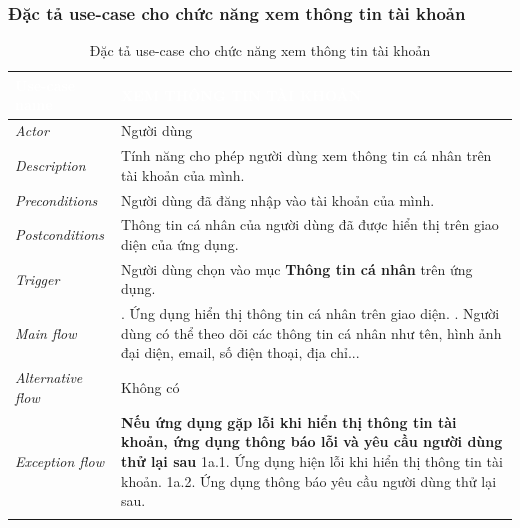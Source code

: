 \subsubsection{Đặc tả use-case cho chức năng xem thông tin tài khoản}
\begin{center}
    \arrayrulewidth=2pt
    \begin{longtable}{
        |>{\raggedright\arraybackslash}p{3cm}
        |>{\raggedright\arraybackslash}p{13cm}
        |}
        \hline
        \rowcolor{cyan!75!black} \textcolor{white}{\textbf{Use-case name}} & \textcolor{white}{\textbf{XEM THÔNG TIN TÀI KHOẢN}}
        \\\hline
        \rowcolor{cyan!10!white} \textit{Actor} & Người dùng
        \\\hdashline
        \rowcolor{cyan!10!white} \textit{Description} & Tính năng cho phép người dùng xem thông tin cá nhân trên tài khoản của mình.
        \\\hdashline
        \rowcolor{cyan!10!white} \textit{Preconditions} & Người dùng đã đăng nhập vào tài khoản của mình.
        \\\hdashline
        \rowcolor{cyan!10!white} \textit{Postconditions} & Thông tin cá nhân của người dùng đã được hiển thị trên giao diện của ứng dụng.
        \\\hdashline
        \rowcolor{cyan!10!white} \textit{Trigger} & Người dùng chọn vào mục \textbf{Thông tin cá nhân} trên ứng dụng.
        \\\hdashline
        \rowcolor{cyan!10!white} \textit{Main flow} & 
        1. Ứng dụng hiển thị thông tin cá nhân trên giao diện. \newline
        2. Người dùng có thể theo dõi các thông tin cá nhân như tên, hình ảnh đại diện, email, số điện thoại, địa chỉ...
        \\\hdashline
        \rowcolor{cyan!10!white} \textit{Alternative flow} & Không có
        \\\hdashline
        \rowcolor{cyan!10!white} \textit{Exception flow} & 
        \textbf{Nếu ứng dụng gặp lỗi khi hiển thị thông tin tài khoản, ứng dụng thông báo lỗi và yêu cầu người dùng thử lại sau} \newline
        1a.1. Ứng dụng hiện lỗi khi hiển thị thông tin tài khoản. \newline
        1a.2. Ứng dụng thông báo yêu cầu người dùng thử lại sau.
        \\\hline
        \caption{Đặc tả use-case cho chức năng xem thông tin tài khoản}
    \end{longtable}
\end{center}
